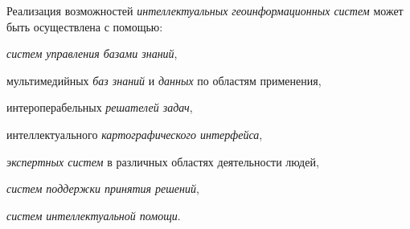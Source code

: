 Реализация возможностей \textit{интеллектуальных геоинформационных систем} может быть осуществлена с помощью:
\begin{textitemize}
	\item \textit{систем управления базами знаний},
	\item мультимедийных \textit{баз знаний} и \textit{данных} по областям применения,
	\item интероперабельных \textit{решателей задач},
	\item интеллектуального \textit{картографического интерфейса},
	\item \textit{экспертных систем} в различных областях деятельности людей,
	\item \textit{систем поддержки принятия решений},
	\item \textit{систем интеллектуальной помощи}.
\end{textitemize}

